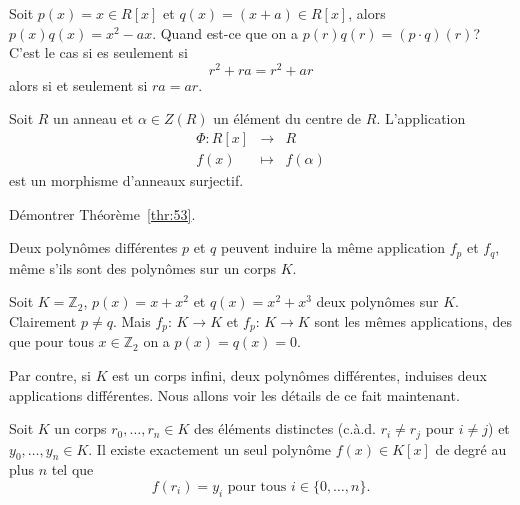 \begin{example}
  \label{exe:43}
  Soit $p(x) = x ∈ R[x]$ et $q(x) = (x + a) ∈ R[x]$, alors $p(x) q(x) = x^2 - ax$. Quand est-ce que on a $p(r) q(r) = (p ⋅q)(r)$? C'est le cas si es seulement si
  \begin{displaymath}
     r^2 + r a = r^2 + a r  
   \end{displaymath}
   alors si et seulement si $ra = ar$. 
\end{example}


\begin{theorem}
  \label{thr:53}
  Soit $R$ un anneau et $\alpha \in Z(R)$ un élément du centre de $R$. L'application 
  \begin{displaymath}   
    \begin{array}{rcl}
    \Phi \colon R[x] &\rightarrow & R \\
           f(x) &\mapsto &f(\alpha)          
    \end{array}
  \end{displaymath}
est un morphisme d'anneaux surjectif. 
\end{theorem}


\begin{exercise}
  \label{exe:44}
  Démontrer Théorème~\ref{thr:53}. 
\end{exercise}

Deux polynômes différentes $p$ et $q$ peuvent induire la même application $f_p$ et $f_q$, même s'ils sont des polynômes sur un corps $K$.

\begin{example}
  \label{exe:36}
  Soit $K = ℤ_2$, $p(x) = x + x^2 $ et $q(x) = x^2 + x^3$ deux
  polynômes sur $K$. Clairement $p ≠ q$. Mais $f_p:\, K →K$ et
  $f_p:\, K →K$ sont les mêmes applications, des que pour tous
  $x ∈ℤ_2$ on a $p(x) = q(x) = 0$.
\end{example}

Par contre, si $K$ est un corps infini, deux polynômes différentes, induises  deux applications différentes. Nous allons voir les détails de ce fait maintenant.

\begin{theorem}
  \label{thr:52}
  Soit $K$ un corps $r_0,\dots,r_n ∈K$ des éléments distinctes (c.à.d. $r_i ≠ r_j$ pour $i≠j$) et $y_0,\dots,y_n ∈K$. Il existe  exactement un seul polynôme $f(x) ∈ K[x]$ de degré au plus $n$ tel que
  \begin{displaymath}
    f(r_i) = y_i \text{ pour tous } i ∈ \{0,\dots,n\}. 
  \end{displaymath}
\end{theorem}

